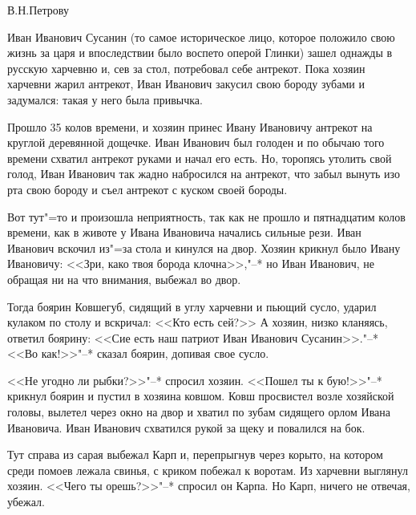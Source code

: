 \begin{flushright}В.Н.Петрову\end{flushright}                                
Иван Иванович Сусанин (то самое историческое лицо, которое положило свою жизнь  за царя и впоследствии было воспето оперой Глинки) зашел однажды в русскую харчевню и, сев за стол, потребовал себе антрекот. Пока хозяин харчевни жарил антрекот, Иван Иванович закусил свою бороду зубами и задумался: такая у него была привычка.
    
Прошло 35 колов времени, и хозяин принес Ивану Ивановичу антрекот на круглой деревянной дощечке. Иван Иванович был голоден и по обычаю того времени схватил антрекот руками и начал его есть. Но, торопясь утолить свой голод, Иван Иванович так жадно набросился на антрекот, что забыл вынуть изо рта свою бороду и съел антрекот с куском своей бороды.

Вот тут"=то и произошла неприятность, так как не прошло и пятнадцатим колов времени, как в животе у Ивана Ивановича начались сильные рези. Иван Иванович вскочил из"=за стола и кинулся на двор. Хозяин крикнул было Ивану Ивановичу: <<Зри, како твоя борода клочна>>,"--* но Иван Иванович, не обращая ни на что внимания, выбежал во двор.
    
Тогда боярин Ковшегуб,  сидящий  в  углу харчевни и пьющий сусло, ударил  кулаком  по столу и вскричал: <<Кто есть сей?>>  А хозяин, низко кланяясь, ответил боярину: <<Сие есть наш патриот  Иван  Иванович  Сусанин>>."--* <<Во как!>>"--* сказал боярин, допивая свое сусло.
    
<<Не  угодно ли рыбки?>>"--* спросил хозяин. <<Пошел ты к бую!>>"--* крикнул боярин и  пустил в  хозяина ковшом. Ковш просвистел возле хозяйской головы, вылетел через окно на двор и хватил по зубам  сидящего орлом Ивана Ивановича. Иван Иванович  схватился рукой за щеку и повалился на бок.
    
Тут справа из сарая выбежал  Карп и, перепрыгнув через корыто, на котором среди помоев лежала свинья, с криком побежал к воротам. Из харчевни выглянул хозяин. <<Чего ты орешь?>>"--* спросил он Карпа. Но Карп,  ничего не отвечая, убежал.
    
